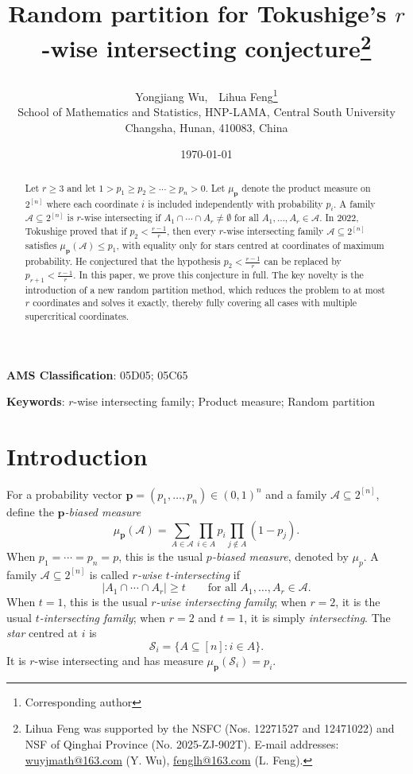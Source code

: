 \documentclass[11pt]{article}
\title{\bf \Large }
\date{\today }
\title{{\bf \Large 
 Random partition for Tokushige's $r$-wise intersecting conjecture}\footnote{ Lihua Feng was supported by the NSFC (Nos. 12271527 and 12471022) and NSF of Qinghai Province (No. 2025-ZJ-902T). E-mail addresses: \url{wuyjmath@163.com} (Y. Wu), \url{fenglh@163.com} (L. Feng). }
\author{
{\small  Yongjiang Wu,\ \ Lihua Feng\footnote{Corresponding author}
}\\[2mm]
\small School of Mathematics and Statistics, HNP-LAMA, Central South University\\
 \small Changsha, Hunan, 410083, China\\ 
}}
\begin{document}
\maketitle
\begin{abstract}   
Let $r\ge 3$ and let $1>p_1\ge p_2\ge\cdots\ge p_n>0$.  
Let $\mu_{\mathbf p}$ denote the product measure on $2^{[n]}$ where each coordinate $i$ is included independently with probability $p_i$. A family $\mathcal A\subseteq 2^{[n]}$ is  $r$-wise intersecting if $A_1\cap\cdots\cap A_r\neq\emptyset$ for all $A_1,\ldots,A_r\in\mathcal A$. 
In 2022, Tokushige proved that if
$p_2<\frac{r-1}{r}$, then every $r$-wise intersecting family
$\mathcal{A}\subseteq 2^{[n]}$ satisfies $\mu_{\mathbf p}(\mathcal{A})\le p_1$, with equality only for
stars centred at coordinates of maximum probability.  He conjectured that the
hypothesis $p_2<\frac{r-1}{r}$ can be replaced by $p_{r+1}<\frac{r-1}{r}$.  In this paper, we prove this
conjecture in full.  The key novelty is the introduction of a new random partition  method, which reduces the problem to at most $r$ coordinates and solves it exactly, thereby fully covering all cases with multiple supercritical coordinates.
\end{abstract}

{\bf AMS Classification}:  05D05; 05C65 

{\bf Keywords}: $r$-wise intersecting family; Product measure; Random partition

\section{Introduction}
For a probability vector $\mathbf{p}=(p_1,\ldots,p_n)\in(0,1)^n$ and a family $\mathcal{A}\subseteq 2^{[n]}$, define the \textit{$\mathbf{p}$-biased measure}
$$
\mu_{\mathbf{p}}(\mathcal{A})=\sum_{A\in\mathcal{A}}\prod_{i\in A}p_i\prod_{j\notin A}(1-p_j).
$$
When $p_1=\cdots=p_n=p$, this is the usual \textit{$p$-biased measure}, denoted by $\mu_p$.
A family $\mathcal{A}\subseteq 2^{[n]}$ is called \textit{$r$-wise $t$-intersecting} if
$$
|A_1\cap\cdots\cap A_r|\geq t\qquad\text{for all }A_1,\ldots,A_r\in\mathcal{A}.
$$
When $t=1$, this is the usual \textit{$r$-wise intersecting family}; when $r=2$, it is the usual \textit{$t$-intersecting family}; when $r=2$ and $t=1$, it is simply \textit{intersecting}. 
The \textit{star} centred at $i$ is
$$
 \mathcal{S}_i=\{A\subseteq[n]:i\in A\}.
$$ 
It is $r$-wise intersecting and has measure $\mu_{\mathbf{p}}(\mathcal{S}_i)=p_i$. 
\end{document}
